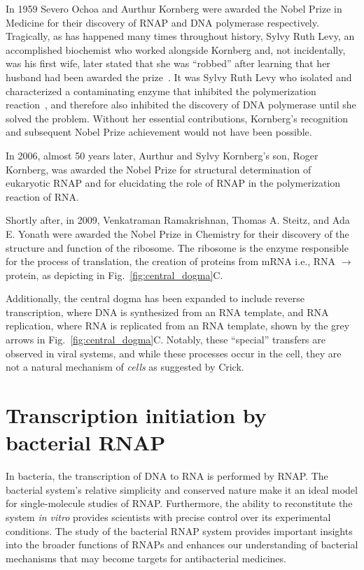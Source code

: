 In 1959 Severo Ochoa and Aurthur Kornberg were awarded the Nobel Prize in Medicine for their discovery of \ac{RNAP} and DNA polymerase respectively. 
Tragically, as has happened many times throughout history, Sylvy Ruth Levy, an accomplished biochemist who worked alongside Kornberg and, not incidentally, was his first wife, later stated that she was \enquote{robbed} after learning that her husband had been awarded the prize~\cite{lenzer_2008}. 
It was Sylvy Ruth Levy who isolated and characterized a contaminating enzyme that inhibited the polymerization reaction~\cite{kornberg_enzymatic_1958}, and therefore also inhibited the discovery of DNA polymerase until she solved the problem.
Without her essential contributions, Kornberg's recognition and subsequent Nobel Prize achievement would not have been possible.

In 2006, almost 50 years later, Aurthur and Sylvy Kornberg's son, Roger Kornberg, was awarded the Nobel Prize for structural determination of eukaryotic RNAP and for elucidating the role of RNAP in the polymerization reaction of RNA. 

Shortly after, in 2009, Venkatraman Ramakrishnan, Thomas A. Steitz, and Ada E. Yonath were awarded the Nobel Prize in Chemistry for their discovery of the structure and function of the ribosome. 
The ribosome is the enzyme responsible for the process of translation, the creation of proteins from \ac{mRNA} i.e., RNA $\rightarrow$ protein, as depicting in
Fig.~\ref{fig:central_dogma}C. 
 
Additionally, the central dogma has been expanded to include reverse transcription, where DNA is synthesized from an RNA template, and RNA replication, where RNA is replicated from an RNA template, shown by the grey arrows in Fig.~\ref{fig:central_dogma}C.
Notably, these \enquote{special} transfers are observed in viral systems, and while these processes occur in the cell, they are not a natural mechanism of \textit{cells} as suggested by Crick.

\section{Transcription initiation by bacterial RNAP}
\label{sec:transcription_initiation}

In bacteria, the transcription of DNA to RNA is performed by RNAP. 
The bacterial system's relative simplicity and conserved nature make it an ideal model for single-molecule studies of RNAP. 
Furthermore, the ability to reconstitute the system \textit{in vitro} provides scientists with precise control over its experimental conditions.
The study of the bacterial RNAP system provides important insights into the broader functions of RNAPs and enhances our understanding of bacterial mechanisms that may become targets for antibacterial medicines.

